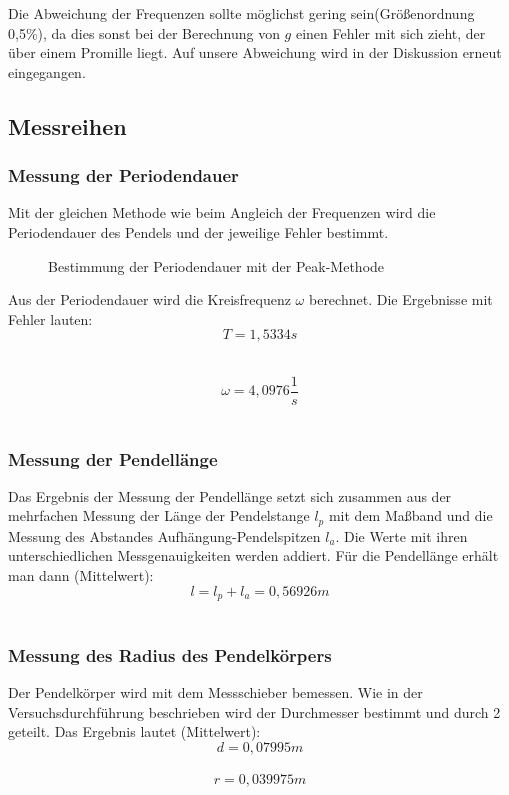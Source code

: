 \documentclass[a4paper, 11pt]{article}
\begin{document}
Die Abweichung der Frequenzen sollte möglichst gering sein(Größenordnung 0,5\%), da dies sonst bei der Berechnung von $g$ einen Fehler mit sich zieht, der über einem Promille liegt. Auf unsere Abweichung wird in der Diskussion erneut eingegangen. 
\newpage

\subsection{Messreihen}
\subsubsection{Messung der Periodendauer}
Mit der gleichen Methode wie beim Angleich der Frequenzen wird die Periodendauer des Pendels und der jeweilige Fehler bestimmt. 

\begin{figure} [H]
\centering
	\caption{Bestimmung der Periodendauer mit der Peak-Methode}
	\label{pic:Abbildung 4}
\end{figure}


Aus der Periodendauer wird die Kreisfrequenz $\omega$ berechnet. Die Ergebnisse mit Fehler lauten:
\\
\begin{equation*}
T = 1,5334s
\end{equation*}\

\begin{equation*}
\omega = 4,0976 \frac{1}{s}
\end{equation*}\


\subsubsection{Messung der Pendellänge}
Das Ergebnis der Messung der Pendellänge setzt sich zusammen aus der mehrfachen Messung der Länge der Pendelstange $l_p$ mit dem Maßband und die Messung des Abstandes Aufhängung-Pendelspitzen $l_a$. Die Werte mit ihren unterschiedlichen Messgenauigkeiten werden addiert. Für die Pendellänge erhält man dann (Mittelwert):
\\
\begin{equation*}
l = l_p + l_a = 0,56926m
\end{equation*}\

\newpage

\subsubsection{Messung des Radius des Pendelkörpers}
Der Pendelkörper wird mit dem Messschieber bemessen. Wie in der Versuchsdurchführung beschrieben wird der Durchmesser bestimmt und durch 2 geteilt. Das Ergebnis lautet (Mittelwert):
\\
\begin{equation*}
d = 0,07995m
\end{equation*}\
\begin{equation*}
r = 0,039975m
\end{equation*}\
\end{document}
